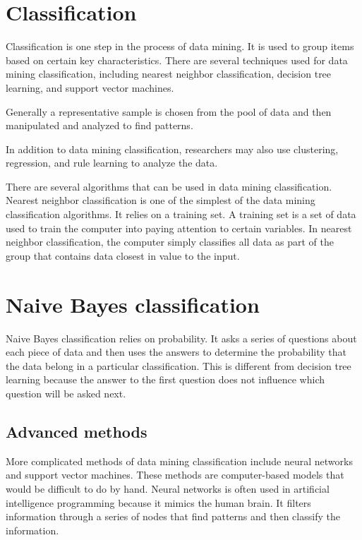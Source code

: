 \section{Classification}    

Classification is one step in the process of data mining. It is used to group items based on certain key characteristics. There are several techniques used for data mining classification, including nearest neighbor classification, decision tree learning, and support vector machines.


Generally a representative sample is chosen from the pool of data and then manipulated and analyzed to find patterns. 


In addition to data mining classification, researchers may also use clustering, regression, and rule learning to analyze the data.


There are several algorithms that can be used in data mining classification. Nearest neighbor classification is one of the simplest of the data mining classification algorithms. It relies on a training set. A training set is a set of data used to train the computer into paying attention to certain variables. In nearest neighbor classification, the computer simply classifies all data as part of the group that contains data closest in value to the input.


\section{Naive Bayes classification}

Naive Bayes classification relies on probability. It asks a series of questions about each piece of data and then uses the answers to determine the probability that the data belong in a particular classification. This is different from decision tree learning because the answer to the first question does not influence which question will be asked next.


\subsection{Advanced methods}

More complicated methods of data mining classification include neural networks and support vector machines. These methods are computer-based models that would be difficult to do by hand. Neural networks is often used in artificial intelligence programming because it mimics the human brain. It filters information through a series of nodes that find patterns and then classify the information.

